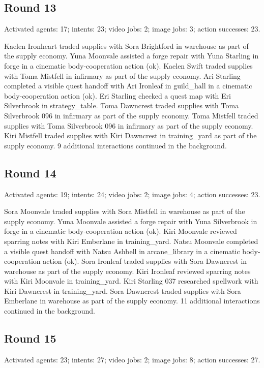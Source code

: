 \documentclass[11pt,a4paper]{article}
\begin{document}
\subsection{Round 13}
Activated agents: 17; intents: 23; video jobs: 2; image jobs: 3; action successes: 23.

Kaelen Ironheart traded supplies with Sora Brightford in warehouse as part of the supply economy. Yuna Moonvale assisted a forge repair with Yuna Starling in forge in a cinematic body-cooperation action (ok). Kaelen Swift traded supplies with Toma Mistfell in infirmary as part of the supply economy. Ari Starling completed a visible quest handoff with Ari Ironleaf in guild\_hall in a cinematic body-cooperation action (ok). Eri Starling checked a quest map with Eri Silverbrook in strategy\_table. Toma Dawncrest traded supplies with Toma Silverbrook 096 in infirmary as part of the supply economy. Toma Mistfell traded supplies with Toma Silverbrook 096 in infirmary as part of the supply economy. Kiri Mistfell traded supplies with Kiri Dawncrest in training\_yard as part of the supply economy. 9 additional interactions continued in the background.

\subsection{Round 14}
Activated agents: 19; intents: 24; video jobs: 2; image jobs: 4; action successes: 23.

Sora Moonvale traded supplies with Sora Mistfell in warehouse as part of the supply economy. Yuna Moonvale assisted a forge repair with Yuna Silverbrook in forge in a cinematic body-cooperation action (ok). Kiri Moonvale reviewed sparring notes with Kiri Emberlane in training\_yard. Natsu Moonvale completed a visible quest handoff with Natsu Ashbell in arcane\_library in a cinematic body-cooperation action (ok). Sora Ironleaf traded supplies with Sora Dawncrest in warehouse as part of the supply economy. Kiri Ironleaf reviewed sparring notes with Kiri Moonvale in training\_yard. Kiri Starling 037 researched spellwork with Kiri Dawncrest in training\_yard. Sora Dawncrest traded supplies with Sora Emberlane in warehouse as part of the supply economy. 11 additional interactions continued in the background.

\subsection{Round 15}
Activated agents: 23; intents: 27; video jobs: 2; image jobs: 8; action successes: 27.
\end{document}
